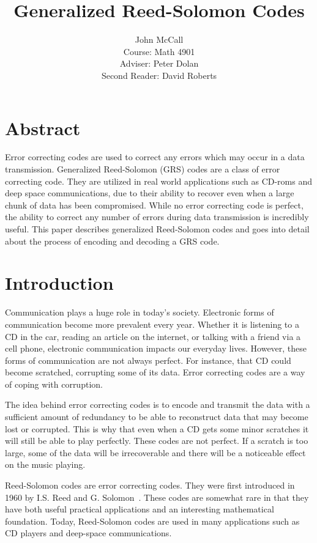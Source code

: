 \documentclass{article}
\title{Generalized Reed-Solomon Codes}
\author{John McCall\\Course: Math 4901\\Adviser: Peter Dolan\\Second Reader: David Roberts}
\begin{document}

\newcommand{\f}[1]{
	\colorbox{greyCode}{\texttt{#1}}
}

\maketitle

\section{Abstract}
Error correcting codes are used to correct any errors which may occur in a data transmission. Generalized Reed-Solomon (GRS) codes are a class of error correcting code. They are utilized in real world applications such as CD-roms and deep space communications, due to their ability to recover even when a large chunk of data has been compromised. While no error correcting code is perfect, the ability to correct any number of errors during data transmission is incredibly useful. This paper describes generalized Reed-Solomon codes and goes into detail about the process of encoding and decoding a GRS code.

\section{Introduction}
Communication plays a huge role in today's society. Electronic forms of communication become more prevalent every year. Whether it is listening to a CD in the car, reading an article on the internet, or talking with a friend via a cell phone, electronic communication impacts our everyday lives. However, these forms of communication are not always perfect. For instance, that CD could become scratched, corrupting some of its data. Error correcting codes are a way of coping with corruption. 

The idea behind error correcting codes is to encode and transmit the data with a sufficient amount of redundancy to be able to reconstruct data that may become lost or corrupted. This is why that even when a CD gets some minor scratches it will still be able to play perfectly. These codes are not perfect. If a scratch is too large, some of the data will be irrecoverable and there will be a noticeable effect on the music playing.

Reed-Solomon codes are error correcting codes. They were first introduced in 1960 by I.S. Reed and G. Solomon~\cite{RS:1960}. These codes are somewhat rare in that they have both useful practical applications and an interesting mathematical foundation. Today, Reed-Solomon codes are used in many applications such as CD players and deep-space communications.
\end{document}

